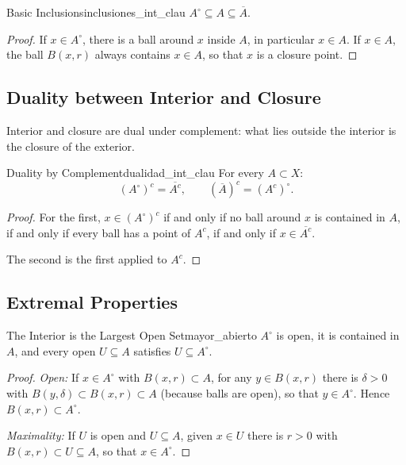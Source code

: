 \documentclass[11pt, a4paper]{article}
\begin{document}
\begin{proposicion}{Basic Inclusions}{inclusiones_int_clau}
$A^\circ \subseteq A \subseteq \overline{A}$.
\end{proposicion}

\begin{proof}
If $x \in A^\circ$, there is a ball around $x$ inside $A$, in particular $x \in A$. If
$x \in A$, the ball $B(x,r)$ always contains $x \in A$, so that $x$ is a closure point.
\end{proof}

\subsection{Duality between Interior and Closure}

Interior and closure are dual under complement: what lies outside the interior is the closure of the
exterior.

\begin{proposicion}{Duality by Complement}{dualidad_int_clau}
For every $A \subset X$:
$$ (A^\circ)^c = \overline{A^c}, \qquad (\overline{A})^c = (A^c)^\circ. $$
\end{proposicion}

\begin{proof}
For the first, $x \in (A^\circ)^c$ if and only if no ball around $x$ is contained in
$A$, if and only if every ball has a point of $A^c$, if and only if $x \in \overline{A^c}$.

The second is the first applied to $A^c$.
\end{proof}

\subsection{Extremal Properties}

\begin{proposicion}{The Interior is the Largest Open Set}{mayor_abierto}
$A^\circ$ is open, it is contained in $A$, and every open $U \subseteq A$ satisfies
$U \subseteq A^\circ$.
\end{proposicion}

\begin{proof}
\textit{Open:} If $x \in A^\circ$ with $B(x, r) \subset A$, for any $y \in B(x, r)$ there is
$\delta > 0$ with $B(y, \delta) \subset B(x, r) \subset A$ (because balls are open), so that
$y \in A^\circ$. Hence $B(x, r) \subset A^\circ$.

\textit{Maximality:} If $U$ is open and $U \subseteq A$, given $x \in U$ there is $r > 0$ with
$B(x, r) \subset U \subseteq A$, so that $x \in A^\circ$.
\end{proof}
\end{document}
